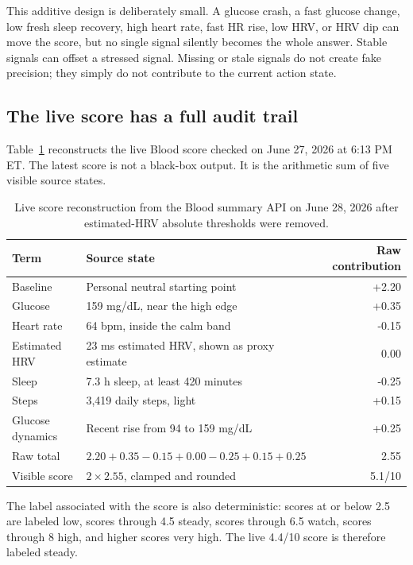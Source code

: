 \documentclass[12pt,letterpaper]{article}
\begin{document}
This additive design is deliberately small. A glucose crash, a fast glucose change, low fresh sleep recovery, high heart rate, fast HR rise, low HRV, or HRV dip can move the score, but no single signal silently becomes the whole answer. Stable signals can offset a stressed signal. Missing or stale signals do not create fake precision; they simply do not contribute to the current action state.

\subsection{The live score has a full audit trail}

Table~\ref{tab:live_snapshot} reconstructs the live Blood score checked on June 27, 2026 at 6:13 PM ET. The latest score is not a black-box output. It is the arithmetic sum of five visible source states.

\begin{table}[H]
\centering
\small
\caption{Live score reconstruction from the Blood summary API on June 28, 2026 after estimated-HRV absolute thresholds were removed.}
\label{tab:live_snapshot}
\begin{tabular}{p{}p{}r}
\toprule
Term & Source state & Raw contribution \\
\midrule
Baseline & Personal neutral starting point & +2.20 \\
Glucose & 159 mg/dL, near the high edge & +0.35 \\
Heart rate & 64 bpm, inside the calm band & -0.15 \\
Estimated HRV & 23 ms estimated HRV, shown as proxy estimate & 0.00 \\
Sleep & 7.3 h sleep, at least 420 minutes & -0.25 \\
Steps & 3,419 daily steps, light & +0.15 \\
Glucose dynamics & Recent rise from 94 to 159 mg/dL & +0.25 \\
\midrule
Raw total & $2.20 + 0.35 - 0.15 + 0.00 - 0.25 + 0.15 + 0.25$ & 2.55 \\
Visible score & $2 \times 2.55$, clamped and rounded & 5.1/10 \\
\bottomrule
\end{tabular}
\end{table}

The label associated with the score is also deterministic: scores at or below 2.5 are labeled low, scores through 4.5 steady, scores through 6.5 watch, scores through 8 high, and higher scores very high. The live 4.4/10 score is therefore labeled steady.
\end{document}
